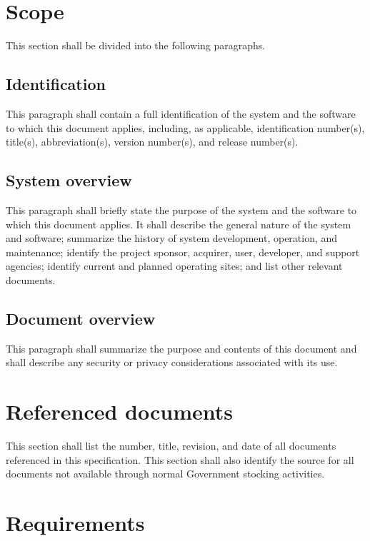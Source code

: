 \documentclass{fidata-report-template}
\begin{document}
\section{Scope}

This section shall be divided into the following paragraphs.

\subsection{Identification}

This paragraph shall contain a full identification of the system and the
software to which this document applies, including, as applicable,
identification number(s), title(s), abbreviation(s), version number(s),
and release number(s).

\subsection{System overview}

This paragraph shall briefly state the purpose of the system and the
software to which this document applies. It shall describe the general
nature of the system and software; summarize the history of system
development, operation, and maintenance; identify the project sponsor,
acquirer, user, developer, and support agencies; identify current and
planned operating sites; and list other relevant documents.

\subsection{Document overview}

This paragraph shall summarize the purpose and contents of this document
and shall describe any security or privacy considerations associated
with its use.

\section{Referenced documents}

This section shall list the number, title, revision, and date of all
documents referenced in this specification. This section shall also
identify the source for all documents not available through normal
Government stocking activities.

\section{Requirements}
\end{document}
